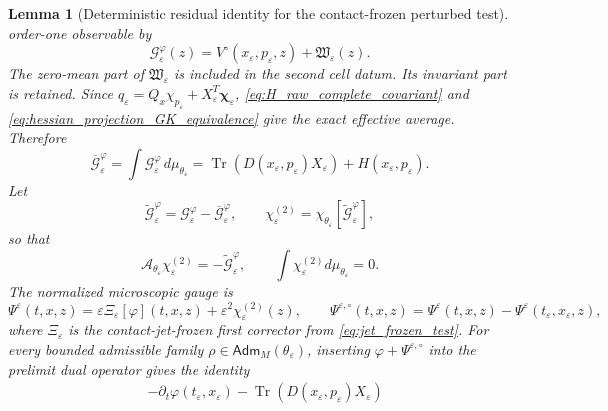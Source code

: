 \documentclass[12pt, letterpaper]{amsart}
\newcommand{\Acal}{\mathcal{A}}
\providecommand{\Tr}{\operatorname{Tr}}
\newcommand{\Adm}{\mathsf{Adm}}
\theoremstyle{plain}
\newtheorem{lemma}[theorem]{Lemma}
\theoremstyle{definition}
\theoremstyle{remark}
\begin{document}
\begin{lemma}[Deterministic residual identity for the contact-frozen perturbed test]
order-one observable by
\begin{equation}
\label{eq:order_one_observable_full}
    \mathcal G_\varepsilon^\varphi(z)
    =V^\circ(x_\varepsilon,p_\varepsilon,z)
      +\mathfrak W_\varepsilon(z).
\end{equation}
The zero-mean part of $\mathfrak W_\varepsilon$ is included in the second cell
datum.  Its invariant part is retained.  Since
$q_\varepsilon=Q_x\chi_{p_\varepsilon}+X_\varepsilon^T\boldsymbol\chi_\varepsilon$,
\eqref{eq:H_raw_complete_covariant} and
\eqref{eq:hessian_projection_GK_equivalence} give the exact effective average.
Therefore
\begin{equation}
\label{eq:order_one_average_full}
    \overline{\mathcal G}_\varepsilon^\varphi
    =\int \mathcal G_\varepsilon^\varphi\,d\mu_{\theta_\varepsilon}
    =\Tr(D(x_\varepsilon,p_\varepsilon)X_\varepsilon)
      +H(x_\varepsilon,p_\varepsilon).
\end{equation}
Let
\begin{equation}
\label{eq:second_cell_equation_full}
    \widetilde{\mathcal G}_\varepsilon^\varphi
       =\mathcal G_\varepsilon^\varphi-\overline{\mathcal G}_\varepsilon^\varphi,
    \qquad
    \chi_\varepsilon^{(2)}
       =\chi_{\theta_\varepsilon}[\widetilde{\mathcal G}_\varepsilon^\varphi],
\end{equation}
so that
\begin{equation}
    \Acal_{\theta_\varepsilon}\chi_\varepsilon^{(2)}
       =-\widetilde{\mathcal G}_\varepsilon^\varphi,
    \qquad
    \int\chi_\varepsilon^{(2)}d\mu_{\theta_\varepsilon}=0.
\end{equation}
The normalized microscopic gauge is
\begin{equation}
\label{eq:normalized_contact_gauge}
    \Psi^\varepsilon(t,x,z)
    =\varepsilon\Xi_\varepsilon[\varphi](t,x,z)
      +\varepsilon^2\chi^{(2)}_\varepsilon(z),
    \qquad
    \Psi^{\varepsilon,\circ}(t,x,z)
    =\Psi^\varepsilon(t,x,z)-\Psi^\varepsilon(t_\varepsilon,x_\varepsilon,z),
\end{equation}
where $\Xi_\varepsilon$ is the contact-jet-frozen first corrector from
\eqref{eq:jet_frozen_test}.  For every bounded admissible family
$\rho\in\Adm_M(\theta_\varepsilon)$, inserting
$\varphi+\Psi^{\varepsilon,\circ}$ into the prelimit dual operator gives the
identity
\begin{equation}
\label{eq:residual_identity_full}
\begin{split}
&-\partial_t\varphi(t_\varepsilon,x_\varepsilon)
 -\Tr(D(x_\varepsilon,p_\varepsilon)X_\varepsilon)

\end{split}
\end{equation}
\end{lemma}
\end{document}
